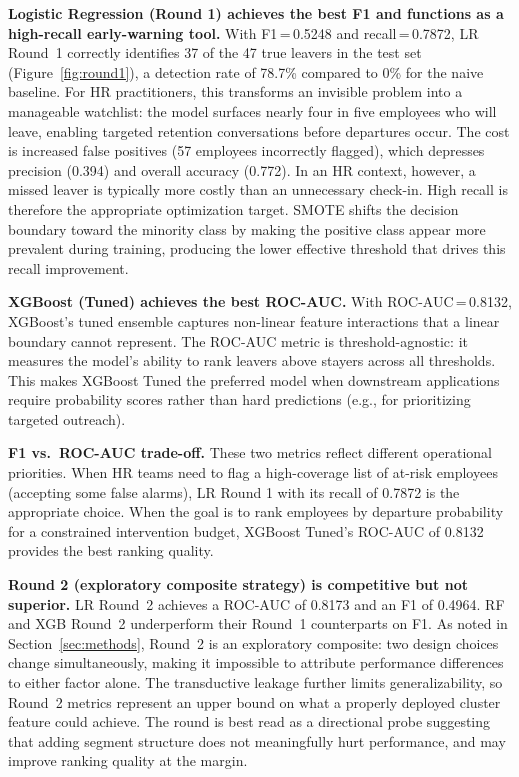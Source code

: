 \documentclass{article}
\begin{document}
\textbf{Logistic Regression (Round 1) achieves the best F1 and functions
as a high-recall early-warning tool.} With F1\,=\,0.5248 and
recall\,=\,0.7872, LR Round~1 correctly identifies 37 of the 47 true
leavers in the test set (Figure~\ref{fig:round1}), a detection rate of
78.7\% compared to 0\% for the naive baseline. For HR practitioners, this
transforms an invisible problem into a manageable watchlist: the model
surfaces nearly four in five employees who will leave, enabling targeted
retention conversations before departures occur. The cost is increased false positives (57 employees incorrectly flagged), which depresses
precision (0.394) and overall accuracy (0.772). In an HR context,
however, a missed leaver is typically more costly than an unnecessary
check-in. High recall is therefore the appropriate optimization target.
SMOTE shifts the decision boundary toward the minority class by
making the positive class appear more prevalent during training, producing
the lower effective threshold that drives this recall improvement.

\textbf{XGBoost (Tuned) achieves the best ROC-AUC.} With
ROC-AUC\,=\,0.8132, XGBoost's tuned ensemble captures non-linear feature
interactions that a linear boundary cannot represent. The ROC-AUC metric
is threshold-agnostic: it measures the model's ability to rank leavers
above stayers across all thresholds. This makes XGBoost Tuned the preferred
model when downstream applications require probability scores rather than
hard predictions (e.g., for prioritizing targeted outreach).

\textbf{F1 vs.\ ROC-AUC trade-off.} These two metrics reflect different
operational priorities. When HR teams need to flag a high-coverage list
of at-risk employees (accepting some false alarms), LR Round 1 with its
recall of 0.7872 is the appropriate choice. When the goal is to rank
employees by departure probability for a constrained intervention budget,
XGBoost Tuned's ROC-AUC of 0.8132 provides the best ranking quality.

\textbf{Round 2 (exploratory composite strategy) is competitive but not
superior.} LR Round~2 achieves a ROC-AUC of 0.8173 and an F1 of 0.4964.
RF and XGB Round~2 underperform their Round~1 counterparts on F1.
As noted in Section~\ref{sec:methods}, Round~2 is an exploratory
composite: two design choices change simultaneously, making it
impossible to attribute performance differences to either factor alone.
The transductive leakage further limits generalizability, so Round~2
metrics represent an upper bound on what a properly deployed cluster
feature could achieve. The round is best read as a directional probe
suggesting that adding segment structure does not meaningfully hurt
performance, and may improve ranking quality at the margin.
\end{document}
